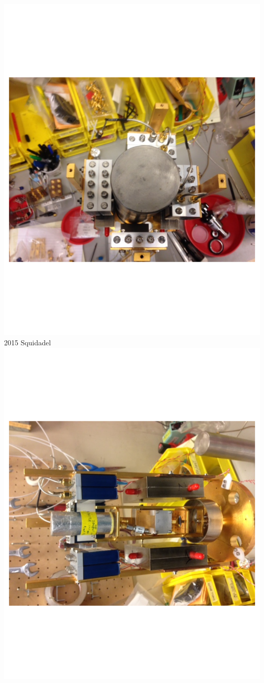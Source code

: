\documentclass{beamer}
\begin{document}
\begin{frame}
\begin{columns}
\includegraphics[width=1.1\textwidth]{top_view_squidadel}
\centering
{\color{blue} 2015 Squidadel}
\includegraphics[width=1.1\textwidth, angle=-90]{new_squidadel}


\end{columns}
\end{frame}
\end{document}
